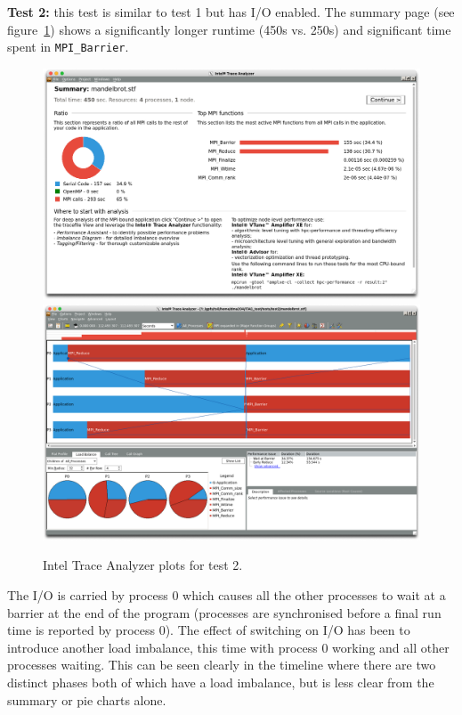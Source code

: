 \documentclass[a4paper,titlepage]{article}
\begin{document}
\noindent
\textbf{Test 2:} this test is similar to test 1 but has I/O enabled. The summary page (see figure~\ref{fig:test2_ITAC_summary}) shows a significantly longer runtime (450s vs. 250s) and significant time spent in \verb+MPI_Barrier+. 
\begin{figure}[htbp]
\begin{center}
\includegraphics[scale=0.3]{figures/test2_summary}
\includegraphics[scale=0.3]{figures/test2_eventTimeline}
\caption{Intel Trace Analyzer plots for test 2.}
\label{fig:test2_ITAC_summary}
\end{center}
\end{figure}
The I/O is carried by process 0 which causes all the other processes to wait at a barrier at the end of the program (processes are synchronised before a final run time is reported by process 0). The effect of switching on I/O has been to introduce another load imbalance, this time with process 0 working and all other processes waiting. This can be seen clearly in the timeline where there are two distinct phases both of which have a load imbalance, but is less clear from the summary or pie charts alone.
\end{document}
